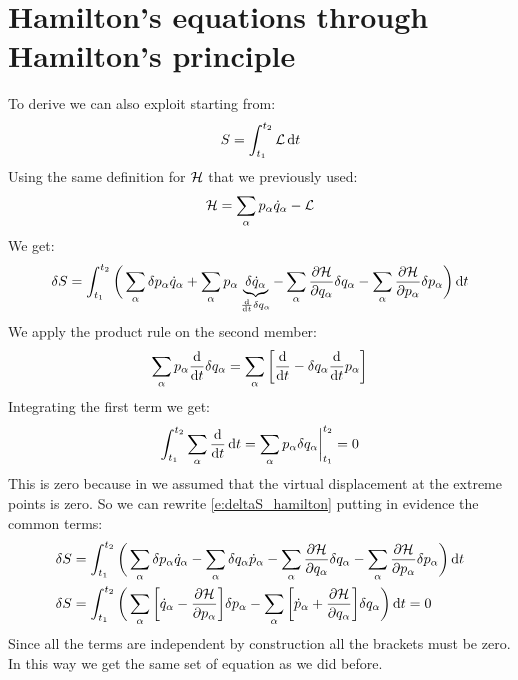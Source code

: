 \section{Hamilton's equations through Hamilton's principle}
To derive \hamiltonref\;we can also exploit \hpquotemath\;starting from:
\begin{equation}
    S = \int_{t_1}^{t_2}\mathcal{L} \dd{t}
\end{equation}
Using the same definition for $\mathcal{H}$ that we previously used:
\begin{equation}
    \mathcal{H} = \displaystyle\sum_{\alpha}p_{\alpha}\dot{q}_{\alpha} - \mathcal{L}
\end{equation}
We get:
\begin{equation} \label{e:deltaS_hamilton}
    \delta S = \int_{t_1}^{t_2}\bigg(\bigsum_{\alpha}\delta p_{\alpha}\dot{q}_{\alpha} + \bigsum_{\alpha} p_{\alpha} \underbrace{\delta \dot{q}_{\alpha}}_{\frac{\dd{}}{\dd{t}}\delta q_{\alpha}} - \bigsum_{\alpha} \pdv{\hamfun}{q_{\alpha}} \delta q_{\alpha}- \bigsum_{\alpha} \pdv{\hamfun}{p_{\alpha}} \delta p_{\alpha}\bigg) \dd{t}
\end{equation}
We apply the product rule on the second member:
\begin{equation}
    \bigsum_{\alpha} p_{\alpha} \dv{}{t}\delta q_{\alpha} = \bigsum_{\alpha} \bigg[ \dv{}{t}(p_{\alpha} \delta q_{\alpha}) -  \delta q_{\alpha}\dv{}{t}p_{\alpha}\bigg]
\end{equation}
Integrating the first term we get:
\begin{equation}
    \int_{t_1}^{t_2} \bigsum_{\alpha} \dv{}{t}(p_{\alpha} \delta q_{\alpha}) \dd{t} = \bigsum_{\alpha} p_{\alpha} \delta q_{\alpha} \bigg|_{t_1}^{t_2} = 0
\end{equation}
This is zero because in \hpquotemath\;we assumed that the virtual displacement at the extreme points is zero. So we can rewrite \eqref{e:deltaS_hamilton} putting in evidence the common terms:
\begin{equation}
    \begin{split}
        \delta S &= \int_{t_1}^{t_2}\bigg(\bigsum_{\alpha}\delta p_{\alpha}\dot{q}_{\alpha} - \bigsum_{\alpha} \delta q_{\alpha}\dot{p}_{\alpha} - \bigsum_{\alpha} \pdv{\hamfun}{q_{\alpha}} \delta q_{\alpha}- \bigsum_{\alpha} \pdv{\hamfun}{p_{\alpha}} \delta p_{\alpha}\bigg) \dd{t} \\
        \delta S &= \int_{t_1}^{t_2}\bigg(\bigsum_{\alpha}\bigg[\dot{q}_{\alpha} - \pdv{\hamfun}{p_{\alpha}}\bigg] \delta p_{\alpha} - \bigsum_{\alpha} \bigg[\dot{p}_{\alpha} + \pdv{\hamfun}{q_{\alpha}} \bigg]\delta q_{\alpha}\bigg) \dd{t} = 0
    \end{split}
\end{equation}
Since all the terms are independent by construction all the brackets must be zero. In this way we get the same set of equation as we did before.
